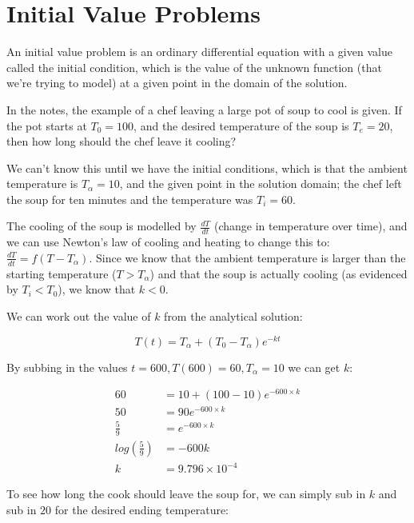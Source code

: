 

%

\section{Initial Value Problems}

An initial value problem is an ordinary differential equation with a
given value called the initial condition, which is the value of the
unknown function (that we're trying to model) at a given point in the
domain of the solution.

In the notes, the example of a chef leaving a large pot of soup to
cool is given. If the pot starts at $T_0 = 100$, and the desired
temperature of the soup is $T_e = 20$, then how long should the chef
leave it cooling?

We can't know this until we have the initial conditions, which is that
the ambient temperature is $T_\alpha = 10$, and the given point in the
solution domain; the chef left the soup for ten minutes and the
temperature was $T_i = 60$.

The cooling of the soup is modelled by $\frac{dT}{dt}$ (change in
temperature over time), and we can use Newton's law of cooling and
heating to change this to: $\frac{dT}{dt} = f(T - T_\alpha)$. Since we
know that the ambient temperature is larger than the starting
temperature ($T > T_\alpha$) and that the soup is actually cooling (as
evidenced by $T_i < T_0$), we know that $k < 0$.

We can work out the value of $k$ from the analytical solution:

\[
  T(t) = T_\alpha + (T_0 - T_\alpha)e^{-kt}
\]

By subbing in the values $t = 600, T(600) = 60, T_\alpha = 10$ we can
get $k$:

\[
  \begin{split}
  60 &= 10 + (100 - 10)e^{-600 \times k}\\
  50 &= 90e^{-600 \times k}\\
  \frac{5}{9} &= e^{-600 \times k}\\
  log(\frac{5}{9}) &= -600k\\
  k &= 9.796\times10^{-4}
  \end{split}
\]

To see how long the cook should leave the soup for, we can simply sub
in $k$ and sub in $20$ for the desired ending temperature:

